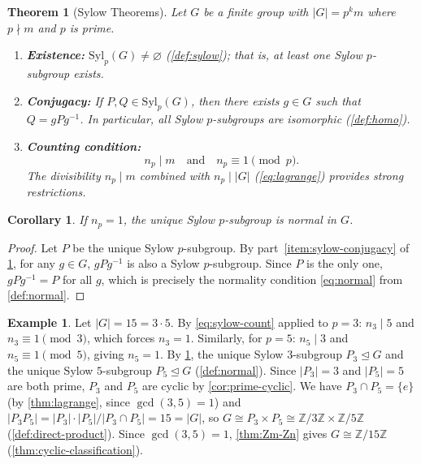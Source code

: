 \documentclass[12pt,a4paper]{article}
\theoremstyle{definition}
\newtheorem{example}[definition]{Example}
\theoremstyle{plain}
\newtheorem{theorem}[definition]{Theorem}
\newtheorem{corollary}[definition]{Corollary}
\theoremstyle{remark}
\newcommand{\Z}{\mathbb{Z}}
\newcommand{\normal}{\trianglelefteq}
\begin{document}
\begin{theorem}[Sylow Theorems]\label{thm:sylow-thm}
Let $G$ be a finite group with $|G| = p^k m$ where
$p \nmid m$ and $p$ is prime.
\begin{enumerate}
    \item \textbf{Existence:} $\text{Syl}_p(G) \neq \varnothing$
          (\cref{def:sylow}); that is, at least one Sylow $p$-subgroup
          exists. \label{item:sylow-existence}
    \item \textbf{Conjugacy:} If $P, Q \in \text{Syl}_p(G)$, then there exists
          $g \in G$ such that $Q = gPg^{-1}$. In particular, all Sylow
          $p$-subgroups are isomorphic (\cref{def:homo}).
          \label{item:sylow-conjugacy}
    \item \textbf{Counting condition:}
          \begin{equation}\label{eq:sylow-count}
              n_p \mid m \quad \text{and} \quad n_p \equiv 1 \pmod{p}.
          \end{equation}
          The divisibility $n_p \mid m$ combined with $n_p \mid |G|$
          (\cref{eq:lagrange}) provides strong restrictions.
          \label{item:sylow-count}
\end{enumerate}
\end{theorem}

\begin{corollary}\label{cor:sylow-normal}
If $n_p = 1$, the unique Sylow $p$-subgroup is normal in $G$.
\end{corollary}

\begin{proof}
Let $P$ be the unique Sylow $p$-subgroup.
By part~\ref{item:sylow-conjugacy} of \cref{thm:sylow-thm}, for any $g \in G$,
$gPg^{-1}$ is also a Sylow $p$-subgroup. Since $P$ is the only one,
$gPg^{-1} = P$ for all $g$, which is precisely the normality condition
\cref{eq:normal} from \cref{def:normal}.
\end{proof}

\begin{example}\label{ex:sylow-15}
Let $|G| = 15 = 3 \cdot 5$.
By \cref{eq:sylow-count} applied to $p = 3$: $n_3 \mid 5$ and
$n_3 \equiv 1 \pmod{3}$, which forces $n_3 = 1$.
Similarly, for $p = 5$: $n_5 \mid 3$ and $n_5 \equiv 1 \pmod{5}$,
giving $n_5 = 1$.
By \cref{cor:sylow-normal}, the unique Sylow $3$-subgroup $P_3 \normal G$
and the unique Sylow $5$-subgroup $P_5 \normal G$ (\cref{def:normal}).
Since $|P_3| = 3$ and $|P_5| = 5$ are both prime, $P_3$ and $P_5$ are cyclic
by \cref{cor:prime-cyclic}. We have $P_3 \cap P_5 = \{e\}$
(by \cref{thm:lagrange}, since $\gcd(3,5) = 1$) and
$|P_3 P_5| = |P_3| \cdot |P_5| / |P_3 \cap P_5| = 15 = |G|$,
so $G \cong P_3 \times P_5 \cong \Z/3\Z \times \Z/5\Z$
(\cref{def:direct-product}). Since $\gcd(3,5) = 1$,
\cref{thm:Zm-Zn} gives $G \cong \Z/15\Z$
(\cref{thm:cyclic-classification}).
\end{example}
\end{document}
